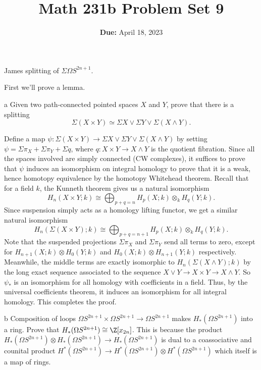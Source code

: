 \documentclass[11pt,letterpaper]{article}
\title{\textbf{Math 231b Problem Set 9}}
\date{\textbf{Due:} April 18, 2023}
\begin{document}
\maketitle

\begin{problem}
    James splitting of $\Sigma \Omega S^{2n+1}$.
\end{problem}

\begin{solution}
    First we'll prove a lemma.
    \begin{partproblem}{a}
        Given two path-connected pointed spaces $X$ and $Y$, prove that there is a splitting
        \[
            \Sigma(X\times Y) \simeq \Sigma X\vee \Sigma Y\vee \Sigma(X\wedge Y).
        \]
    \end{partproblem}
    \quad Define a map $\psi : \Sigma(X\times Y) \to \Sigma X \vee \Sigma Y \vee \Sigma(X\wedge Y)$ by setting $\psi = \Sigma\pi_X + \Sigma \pi_Y + \Sigma q$, where $q : X\times Y\to X\wedge Y$ is the quotient fibration. Since all the spaces involved are simply connected (CW complexes), it suffices to prove that $\psi$ induces an isomorphism on integral homology to prove that it is a weak, hence homotopy equivalence by the homotopy Whitehead theorem. Recall that for a field $k$, the Kunneth theorem gives us a natural isomorphism
    \[
        H_n(X\times Y; k)\cong \bigoplus_{p+q=n} H_p(X;k)\otimes_k H_q(Y; k)
    .\]
    Since suspension simply acts as a homology lifting functor, we get a similar natural isomorphism
    \[
        H_n(\Sigma(X\times Y); k)\cong \bigoplus_{p+q=n+1} H_p(X;k)\otimes_k H_q(Y; k)
    .\]
    Note that the suspended projections $\Sigma \pi_X$ and $\Sigma \pi_Y$ send all terms to zero, except for $H_{n+1}(X;k)\otimes H_0(Y;k)$ and $H_{0}(X;k)\otimes H_{n+1}(Y;k)$ respectively. Meanwhile, the middle terms are exactly isomorphic to $H_n(\Sigma(X\wedge Y); k)$ by the long exact sequence associated to the sequence $X\vee Y \to X\times Y \to X\wedge Y$. So $\psi_*$ is an isomorphism for all homology with coefficients in a field. Thus, by the universal coefficients theorem, it induces an isomorphism for all integral homology. This completes the proof.
    \begin{partproblem}{b}
        Composition of loops $\Omega S^{2n+1}\times \Omega S^{2n+1} \to \Omega S^{2n+1}$ makes $H_*(\Omega S^{2n+1})$ into a ring. Prove that $H_*(\Omega S^{2n+1})\cong \Z[x_{2n}]$. This is because the product $H_*(\Omega S^{2n+1})\otimes H_*(\Omega S^{2n+1}) \to H_*(\Omega S^{2n+1})$ is dual to a coassociative and counital product $H^*(\Omega S^{2n+1}) \to H^*(\Omega S^{2n+1})\otimes H^*(\Omega S^{2n+1})$ which itself is a map of rings.

\end{partproblem}
\end{solution}
\end{document}
